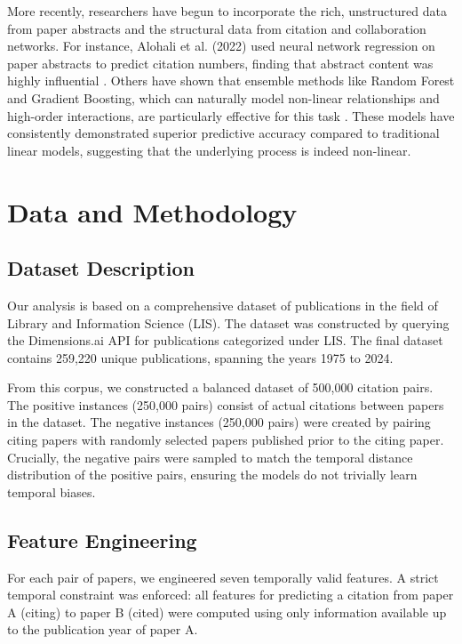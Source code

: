 \documentclass[11pt,a4paper]{article}
\begin{document}
More recently, researchers have begun to incorporate the rich, unstructured data from paper abstracts and the structural data from citation and collaboration networks. For instance, Alohali et al. (2022) used neural network regression on paper abstracts to predict citation numbers, finding that abstract content was highly influential \cite{alohali2022}. Others have shown that ensemble methods like Random Forest and Gradient Boosting, which can naturally model non-linear relationships and high-order interactions, are particularly effective for this task \cite{natekin2013}. These models have consistently demonstrated superior predictive accuracy compared to traditional linear models, suggesting that the underlying process is indeed non-linear.

\section{Data and Methodology}

\subsection{Dataset Description}
Our analysis is based on a comprehensive dataset of publications in the field of Library and Information Science (LIS). The dataset was constructed by querying the Dimensions.ai API for publications categorized under LIS. The final dataset contains 259,220 unique publications, spanning the years 1975 to 2024.

From this corpus, we constructed a balanced dataset of 500,000 citation pairs. The positive instances (250,000 pairs) consist of actual citations between papers in the dataset. The negative instances (250,000 pairs) were created by pairing citing papers with randomly selected papers published prior to the citing paper. Crucially, the negative pairs were sampled to match the temporal distance distribution of the positive pairs, ensuring the models do not trivially learn temporal biases.

\subsection{Feature Engineering}
For each pair of papers, we engineered seven temporally valid features. A strict temporal constraint was enforced: all features for predicting a citation from paper A (citing) to paper B (cited) were computed using only information available up to the publication year of paper A.
\end{document}
